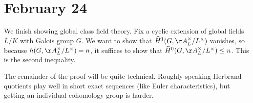 \documentclass[../notes.tex]{subfiles}
\begin{document}
\section{February 24}

We finish showing global class field theory. Fix a cyclic extension of global fields $L/K$ with Galois group $G$. We want to show that $\widehat H^1(G,\AA_L^\times/L^\times)$ vanishes, so because $h(G,\AA_L^\times/L^\times)=n$, it suffices to show that $\widehat H^0(G,\AA_L^\times/L^\times)\le n$. This is the second inequality.
\begin{remark}
	The remainder of the proof will be quite technical. Roughly speaking Herbrand quotients play well in short exact sequences (like Euler characteristics), but getting an individual cohomology group is harder.
\end{remark}
\end{document}
